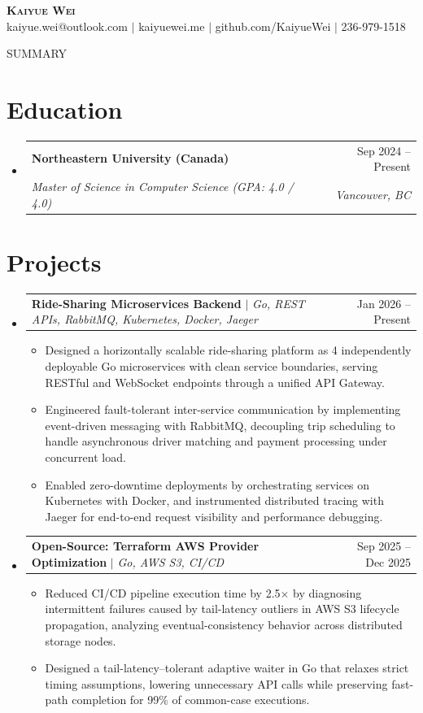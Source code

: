 \documentclass[letterpaper,11pt]{article}
\makeatletter
\newcommand{\resumeItem}[1]{\item\small{#1 \vspace{-2pt}}}
\newcommand{\resumeSubheading}[4]{
  \vspace{-2pt}\item
    \begin{tabular*}{0.97\textwidth}[t]{l@{\extracolsep{\fill}}r}
      \textbf{#1} & #2 \\
      \textit{\small#3} & \textit{\small #4} \\
    \end{tabular*}\vspace{-7pt}
}
\newcommand{\resumeProjectHeading}[2]{
    \item
    \begin{tabular*}{0.97\textwidth}{l@{\extracolsep{\fill}}r}
      \small#1 & #2 \\
    \end{tabular*}\vspace{-7pt}
}
\newcommand{\resumeSubHeadingListStart}{\begin{itemize}[leftmargin=0.15in, label={}]}
\newcommand{\resumeSubHeadingListEnd}{\end{itemize}}
\newcommand{\resumeItemListStart}{\begin{itemize}}
\newcommand{\resumeItemListEnd}{\end{itemize}\vspace{-5pt}}
\makeatother
\begin{document}
\begin{center}
    \textbf{\Huge \scshape Kaiyue Wei} \\ \vspace{1pt}
    \small kaiyue.wei@outlook.com $|$ kaiyuewei.me $|$ github.com/KaiyueWei $|$ 236-979-1518
\end{center}

\vspace{-6pt}
\begin{center}
\small {{SUMMARY}}
\end{center}

\section{Education}
\resumeSubHeadingListStart
    \resumeSubheading
      {Northeastern University (Canada)}{Sep 2024 -- Present}
      {Master of Science in Computer Science (GPA: 4.0 / 4.0)}{Vancouver, BC}
\resumeSubHeadingListEnd

\section{Projects}
\resumeSubHeadingListStart
    \resumeProjectHeading
      {\textbf{Ride-Sharing Microservices Backend} $|$ \emph{Go, REST APIs, RabbitMQ, Kubernetes, Docker, Jaeger}}{Jan 2026 -- Present}
    \resumeItemListStart
        \resumeItem{Designed a horizontally scalable ride-sharing platform as 4 independently deployable Go microservices with clean service boundaries, serving RESTful and WebSocket endpoints through a unified API Gateway.}
        \resumeItem{Engineered fault-tolerant inter-service communication by implementing event-driven messaging with RabbitMQ, decoupling trip scheduling to handle asynchronous driver matching and payment processing under concurrent load.}
        \resumeItem{Enabled zero-downtime deployments by orchestrating services on Kubernetes with Docker, and instrumented distributed tracing with Jaeger for end-to-end request visibility and performance debugging.}
    \resumeItemListEnd

    \resumeProjectHeading
      {\textbf{Open-Source: Terraform AWS Provider Optimization} $|$ \emph{Go, AWS S3, CI/CD}}{Sep 2025 -- Dec 2025}
    \resumeItemListStart
        \resumeItem{Reduced CI/CD pipeline execution time by 2.5$\times$ by diagnosing intermittent failures caused by tail-latency outliers in AWS S3 lifecycle propagation, analyzing eventual-consistency behavior across distributed storage nodes.}
        \resumeItem{Designed a tail-latency--tolerant adaptive waiter in Go that relaxes strict timing assumptions, lowering unnecessary API calls while preserving fast-path completion for 99\% of common-case executions.}
    \resumeItemListEnd
\resumeSubHeadingListEnd
\end{document}
